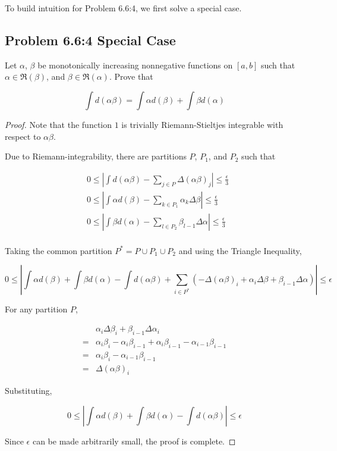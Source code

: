 \documentclass{amsart}
\newcommand{\RiemannIntable}{
  \mathfrak{R}
}
\begin{document}
To build intuition for Problem 6.6:4, we first solve a special case.

\subsection*{Problem 6.6:4 Special Case}

Let $\alpha$, $\beta$ be monotonically increasing nonnegative functions on $[a, b]$ such that $\alpha \in \RiemannIntable(\beta)$, and $\beta \in \RiemannIntable(\alpha)$. Prove that

\[
\int d(\alpha \beta) = \int \alpha d(\beta) + \int \beta d(\alpha)
\]

\begin{proof}

Note that the function $1$ is trivially Riemann-Stieltjes integrable with respect to $\alpha \beta$.

Due to Riemann-integrability, there are partitions $P$, $P_1$, and $P_2$ such that

\begin{align*}
& 0 \leq |\int d(\alpha\beta) - \sum_{j \in P} \Delta(\alpha\beta)_j | \leq \frac{\epsilon}{3} \\
& 0 \leq |\int \alpha d(\beta) - \sum_{k \in P_1} \alpha_k \Delta\beta | \leq \frac{\epsilon}{3} \\
& 0 \leq |\int \beta d(\alpha) - \sum_{l \in P_2} \beta_{l-1} \Delta\alpha | \leq \frac{\epsilon}{3} \\
\end{align*}

Taking the common partition $P^* = P \cup P_1 \cup P_2$ and using the Triangle Inequality,

\[
0 \leq |
\int \alpha d(\beta) + \int \beta d(\alpha) - \int d(\alpha\beta)
+ \sum_{i \in P^*} (- \Delta(\alpha\beta)_i + \alpha_i \Delta\beta + \beta_{i-1} \Delta\alpha)
| \leq \epsilon
\]

For any partition $P$,

\begin{align*}
&\alpha_i \Delta\beta_i + \beta_{i-1} \Delta\alpha_i \\
= &\alpha_i \beta_i - \alpha_i \beta_{i-1} + \alpha_i \beta_{i-1} - \alpha_{i-1} \beta_{i-1} \\
= & \alpha_i\beta_i - \alpha_{i-1} \beta_{i-1} \\
= & \Delta(\alpha\beta)_i
\end{align*}

Substituting,

\[
0 \leq |
\int \alpha d(\beta) + \int \beta d(\alpha) - \int d(\alpha\beta)| \leq \epsilon
\]

Since $\epsilon$ can be made arbitrarily small, the proof is complete.

\end{proof}
\end{document}

